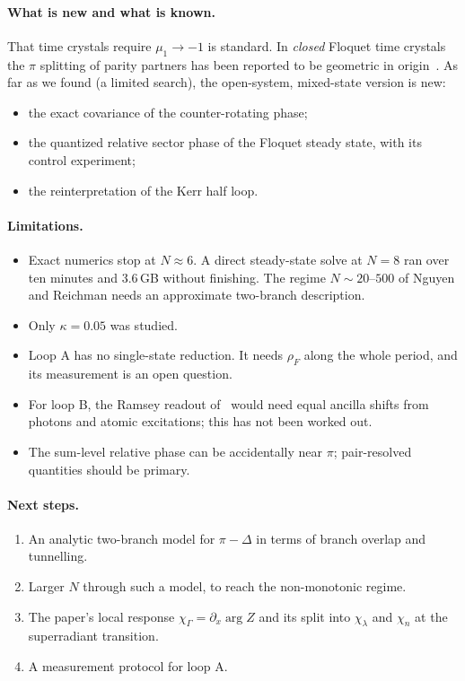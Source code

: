\documentclass[11pt,a4paper]{article}
\begin{document}
\paragraph{What is new and what is known.} That time crystals require $\mu_1\to-1$ is standard. In
\emph{closed} Floquet time crystals the $\pi$ splitting of parity partners has been reported to
be geometric in origin~\cite{schindler2024}. As far as we found (a limited search), the
open-system, mixed-state version is new:
\begin{itemize}
\item the exact covariance of the counter-rotating phase;
\item the quantized relative sector phase of the Floquet steady state, with its control
  experiment;
\item the reinterpretation of the Kerr half loop.
\end{itemize}

\paragraph{Limitations.}
\begin{itemize}
\item Exact numerics stop at $N\approx6$. A direct steady-state solve at $N=8$ ran over ten
  minutes and 3.6\,GB without finishing. The regime $N\sim20$–$500$ of Nguyen and Reichman needs
  an approximate two-branch description.
\item Only $\kappa=0.05$ was studied.
\item Loop A has no single-state reduction. It needs $\rho_F$ along the whole period, and its
  measurement is an open question.
\item For loop B, the Ramsey readout of~\cite{sun_gp} would need equal ancilla shifts from
  photons and atomic excitations; this has not been worked out.
\item The sum-level relative phase can be accidentally near $\pi$; pair-resolved quantities
  should be primary.
\end{itemize}

\paragraph{Next steps.}
\begin{enumerate}[label=(\arabic*)]
\item An analytic two-branch model for $\pi-\Delta$ in terms of branch overlap and tunnelling.
\item Larger $N$ through such a model, to reach the non-monotonic regime.
\item The paper's local response $\chi_\Gamma=\partial_x\arg Z$ and its split into $\chi_\lambda$
  and $\chi_n$ at the superradiant transition.
\item A measurement protocol for loop A.
\end{enumerate}
\end{document}
